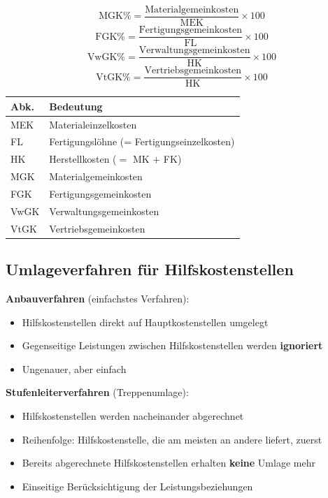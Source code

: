 \documentclass[10pt,a4paper]{article}
\begin{document}
\begin{multicols}{2}
\begin{formelbox}
\[
\text{MGK\%} = \frac{\text{Materialgemeinkosten}}{\text{MEK}} \times 100
\]
\[
\text{FGK\%} = \frac{\text{Fertigungsgemeinkosten}}{\text{FL}} \times 100
\]
\[
\text{VwGK\%} = \frac{\text{Verwaltungsgemeinkosten}}{\text{HK}} \times 100
\]
\[
\text{VtGK\%} = \frac{\text{Vertriebsgemeinkosten}}{\text{HK}} \times 100
\]
\end{formelbox}

\begin{tabular}{|L{2cm}|L{5cm}|}
\hline
{}
\textbf{Abk.} & \textbf{Bedeutung} \\
\hline
MEK & Materialeinzelkosten \\
FL & Fertigungslöhne (= Fertigungseinzelkosten) \\
HK & Herstellkosten ($= $ MK $+$ FK) \\
MGK & Materialgemeinkosten \\
FGK & Fertigungsgemeinkosten \\
VwGK & Verwaltungsgemeinkosten \\
VtGK & Vertriebsgemeinkosten \\
\hline
\end{tabular}

\columnbreak

\subsection{Umlageverfahren für Hilfskostenstellen}

\textbf{Anbauverfahren} (einfachstes Verfahren):
\begin{itemize}[noitemsep, leftmargin=*]
  \item Hilfskostenstellen direkt auf Hauptkostenstellen umgelegt
  \item Gegenseitige Leistungen zwischen Hilfskostenstellen werden \textbf{ignoriert}
  \item Ungenauer, aber einfach
\end{itemize}

\vspace{4pt}
\textbf{Stufenleiterverfahren} (Treppenumlage):
\begin{itemize}[noitemsep, leftmargin=*]
  \item Hilfskostenstellen werden nacheinander abgerechnet
  \item Reihenfolge: Hilfskostenstelle, die am meisten an andere liefert, zuerst
  \item Bereits abgerechnete Hilfskostenstellen erhalten \textbf{keine} Umlage mehr
  \item Einseitige Berücksichtigung der Leistungsbeziehungen
\end{itemize}


\end{multicols}
\end{document}

